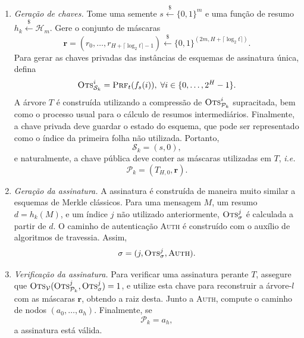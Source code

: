 \documentclass{ufsctex/ufsctex}
\newcommand{\hh}{\mathcal{H}}
\newcommand{\pk}{\mathcal{P}_{k}}
\newcommand{\sk}{\mathcal{S}_{k}}
\newcommand{\binwds}[1]{\{0, 1\}^{#1}}
\newcommand{\random}{\stackrel{\$}{\longleftarrow}}
\begin{document}
\begin{enumerate}

  \item[] \emph{Geração de chaves.} Tome uma semente $s \random{} \binwds{m}$ e
      uma função de resumo $h_{k} \random{} \hh{}_{m}$. Gere o conjunto de
        máscaras
      \begin{equation}
        \mathbf{r} = (r_{0}, \dots, r_{H + \lceil \log_{2} t \rceil - 1})
          \random{} \binwds{(2m, H + \lceil \log_{2} t \rceil)}.
      \end{equation}
        Para gerar as chaves privadas das instâncias de esquemas de assinatura
        única, defina
        \begin{equation}
          \textsc{Ots}_{\sk{}}^{i} = \textsc{Prf}_{t}(f_{s}(i)),
            \; \forall i \in \{0, \dots, 2^{H} - 1\}.
        \end{equation}
        A árvore $T$ é construída utilizando a compressão de
        $\textsc{Ots}_{\pk{}}^{i}$ supracitada, bem como o processo usual para
        o cálculo de resumos intermediários. Finalmente, a chave privada deve
        guardar o estado do esquema, que pode ser representado como o índice da
        primeira folha não utilizada. Portanto,
        \begin{equation}
          \sk{} = (s, 0),
        \end{equation}
        e naturalmente, a chave pública deve conter as máscaras utilizadas em
        $T$, \emph{i.e.}
        \begin{equation}
          \pk{} = (T_{H, 0}, \mathbf{r}).
        \end{equation}

  \item[] \emph{Geração da assinatura.} A assinatura é construída de maneira
      muito similar a esquemas de Merkle clássicos. Para uma mensagem $M$, um
        resumo $d = h_{k}(M)$, e um índice $j$ não utilizado anteriormente,
        $\textsc{Ots}_\sigma^{j}$ é calculada a partir de $d$. O caminho de
        autenticação \textsc{Auth} é construído com o auxílio de algoritmos de
        travessia. Assim,
        \begin{equation}
          \sigma = (j, \textsc{Ots}_\sigma^{j}, \textsc{Auth}).
        \end{equation}

  \item[] \emph{Verificação da assinatura.} Para verificar uma assinatura
      perante $T$, assegure que
        $\textsc{Ots}_{\mathcal{V}}(\textsc{Ots}_{\pk{}}^{j},
        \textsc{Ots}_{\sigma}^{j}) = 1$, e utilize esta chave para reconstruir
        a árvore-$l$ com as máscaras $\mathbf{r}$, obtendo a raiz desta. Junto
        a \textsc{Auth}, compute o caminho de nodos $(a_{0}, \dots, a_{h})$.
        Finalmente, se
        \begin{equation}
          \pk{} = a_{h},
        \end{equation}
        a assinatura está válida.

\end{enumerate}
\end{document}
